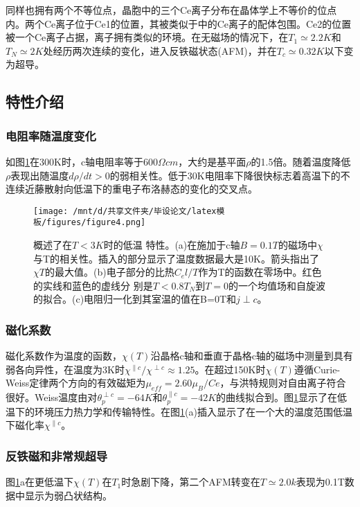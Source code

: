 同样也拥有两个不等位点，晶胞中的三个Ce离子分布在晶体学上不等价的位点内。两个Ce离子位于Ce1的位置，其被类似于中的Ce离子的配体包围。Ce2的位置被一个Ce离子占据，离子拥有类似的环境。在无磁场的情况下，在$T_1 \simeq 2.2K$和$T_N \simeq 2K$处经历两次连续的变化，进入反铁磁状态(AFM)，并在$T_c \simeq 0.32K$以下变为超导。

\subsection{特性介绍}
\subsubsection{电阻率随温度变化}
如图\ref{fig2}在300K时，c轴电阻率等于$600 \Omega cm$，大约是基平面$\rho$的1.5倍。随着温度降低$\rho$表现出随温度$d \rho /d t > 0$的弱相关性。低于30K电阻率下降很快标志着高温下的不连续近藤散射向低温下的重电子布洛赫态的变化的交叉点。

\begin{figure}[h]
    \centering
    \texttt{[image: /mnt/d/共享文件夹/毕设论文/latex模板/figures/figure4.png]}
    \caption{概述了在$T < 3K$时的低温 特性。(a)在施加于c轴$B = 0.1T$的磁场中$\chi$与T的相关性。插入的部分显示了温度数据最大是10K。箭头指出了$\chi T$的最大值。(b)电子部分的比热$C_el/T$作为T的函数在零场中。红色的实线和蓝色的虚线分 别是$T < 0.8T_N$到$T = 0$的一个均值场和自旋波的拟合。(c)电阻归一化到其室温的值在B=0T和$j\perp c$。}
    \label{fig2}
\end{figure}

\subsubsection{磁化系数}
磁化系数作为温度的函数，$\chi(T)$沿晶格c轴和垂直于晶格c轴的磁场中测量到具有弱各向异性，在温度为3K时$\chi^{\parallel c}/\chi^{\perp c} \approx 1.25$。在超过150K时$\chi(T)$遵循Curie-Weiss定律两个方向的有效磁矩为$\mu_{eff}=2.60\mu_B /Ce$，与洪特规则对自由离子符合很好。Weiss温度由对$\theta^{\perp c}_{p}=-64K$和$\theta^{\parallel c}_p=-42K$的曲线拟合到。图\ref{fig2}显示了在低温下的环境压力热力学和传输特性。在图\ref{fig2}(a)插入显示了在一个大的温度范围低温下磁化率$\chi^{\parallel c}$。

\subsubsection{反铁磁和非常规超导}
图\ref{fig2}a在更低温下$\chi(T)$在$T_1$时急剧下降，第二个AFM转变在$T \simeq 2.0k$表现为0.1T数据中显示为弱凸状结构。

